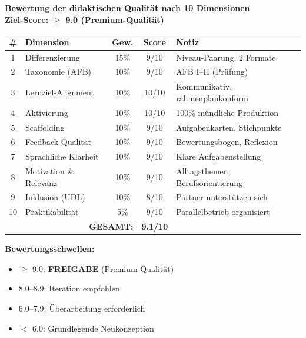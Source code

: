 \documentclass[11pt,a4paper]{article}
\begin{document}
\begin{scorebox}
\textbf{Bewertung der didaktischen Qualität nach 10 Dimensionen}\\
\textbf{Ziel-Score: $\geq$ 9.0 (Premium-Qualität)}

\vspace{1em}
\begin{tabular}{|c|l|c|c|p{4.5cm}|}
\hline
\textbf{\#} & \textbf{Dimension} & \textbf{Gew.} & \textbf{Score} & \textbf{Notiz} \\
\hline
1 & Differenzierung & 15\% & 9/10 & Niveau-Paarung, 2 Formate \\
\hline
2 & Taxonomie (AFB) & 10\% & 9/10 & AFB I--II (Prüfung) \\
\hline
3 & Lernziel-Alignment & 10\% & 10/10 & Kommunikativ, rahmenplankonform \\
\hline
4 & Aktivierung & 10\% & 10/10 & 100\% mündliche Produktion \\
\hline
5 & Scaffolding & 10\% & 9/10 & Aufgabenkarten, Stichpunkte \\
\hline
6 & Feedback-Qualität & 10\% & 9/10 & Bewertungsbogen, Reflexion \\
\hline
7 & Sprachliche Klarheit & 10\% & 9/10 & Klare Aufgabenstellung \\
\hline
8 & Motivation \& Relevanz & 10\% & 9/10 & Alltagsthemen, Berufsorientierung \\
\hline
9 & Inklusion (UDL) & 10\% & 8/10 & Partner unterstützen sich \\
\hline
10 & Praktikabilität & 5\% & 9/10 & Parallelbetrieb organisiert \\
\hline
\multicolumn{3}{|r|}{\textbf{GESAMT:}} & \textbf{9.1/10} & \\
\hline
\end{tabular}

\vspace{1em}
\textbf{Bewertungsschwellen:}
\begin{itemize}
    \item[\checkmark] \textcolor{successgreen}{$\geq$ 9.0: \textbf{FREIGABE} (Premium-Qualität)}
    \item[$\Box$] \textcolor{warningorange}{8.0--8.9: Iteration empfohlen}
    \item[$\Box$] 6.0--7.9: Überarbeitung erforderlich
    \item[$\Box$] $<$ 6.0: Grundlegende Neukonzeption
\end{itemize}
\end{scorebox}
\end{document}
